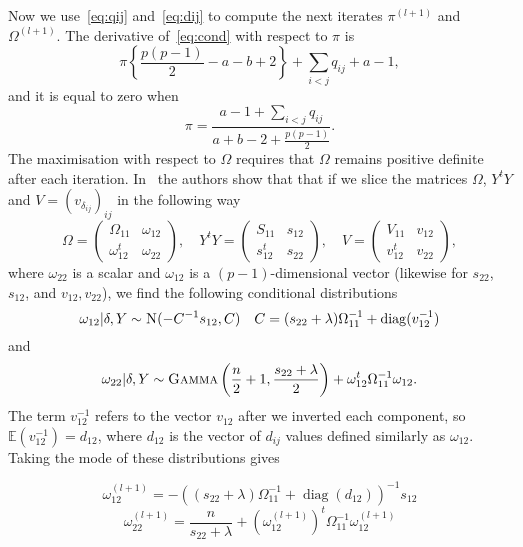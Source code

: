 \documentclass{scrartcl}
\DeclareMathOperator{\diag}{diag}
\newcommand{\E}{\mathbb{E}}
\newcommand{\1}{\mathds{1}}
\newcommand{\Nor}{\textsc{N}}
\begin{document}
Now we use~\eqref{eq:qij} and~\eqref{eq:dij} to compute the next iterates $\pi^{(l+1)}$ and $\Omega^{(l+1)}$.
The derivative of~\eqref{eq:cond} with respect to $\pi$ is
\[\pi\left\{\frac{p(p-1)}{2} - a - b + 2\right\} + \sum_{i<j} q_{ij} + a - 1,\]
and it is equal to zero when \[\pi = \frac{a-1 + \sum_{i<j}q_{ij}}{a + b - 2 +
	\frac{p(p-1)}{2}}.\]
The maximisation with respect to $\Omega$ requires that $\Omega$ remains positive definite
after each iteration. In~\cite{wang-2015} the authors show that that if we
slice the matrices $\Omega$, $Y^t Y$ and $V = (v_{\delta_{ij}})_{ij}$ in the following way
\[\Omega = \begin{pmatrix}
		\Omega_{11}   & \omega_{12} \\
		\omega_{12}^t & \omega_{22}
	\end{pmatrix},
	\quad
	Y^t Y = \begin{pmatrix}
		S_{11}   & s_{12} \\
		s_{12}^t & s_{22}
	\end{pmatrix},
	\quad
	V = \begin{pmatrix}
		V_{11}   & v_{12} \\
		v_{12}^t & v_{22}
	\end{pmatrix},
\]
where $\omega_{22}$ is a scalar and $\omega_{12}$ is a $(p-1)$-dimensional vector (likewise for $s_{22}$, $s_{12}$, and $v_{12}, v_{22}$), we find the following conditional distributions
\[\omega_{12} | \delta, Y \sim \Nor(-C^{-1}s_{12}, C) \quad C=(s_{22} + \lambda) \Omega_{11}^{-1} + \diag(v_{12}^{-1})\]
and
\[\omega_{22} | \delta , Y \sim \textsc{Gamma}\left(\frac{n}{2} + 1, \frac{s_{22} +
		\lambda}{2}\right) + \omega_{12}^t\Omega_{11}^{-1}\omega_{12}.\]
The term $v_{12}^{-1}$ refers to the vector $v_{12}$ after we inverted each
component, so $\E(v_{12}^{-1}) = d_{12}$, where $d_{12}$ is the
vector of $d_{ij}$ values defined similarly as $\omega_{12}$.
Taking the mode of these distributions gives

\[\omega_{12}^{(l+1)} = -((s_{22} + \lambda) \Omega_{11}^{-1} + \diag(d_{12}))^{-1} s_{12} \]
\[\omega_{22}^{(l+1)} = \frac{n}{s_{22} + \lambda} + (\omega_{12}^{(l+1)})^t \Omega_{11}^{-1}\omega_{12}^{(l+1)}\]
\end{document}
